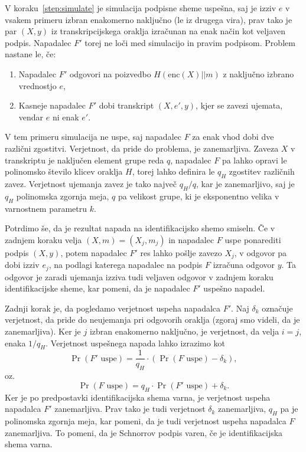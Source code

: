 \begin{dokaz}
\begin{enumerate}
    \end{enumerate}
    V koraku~\ref{step:simulate} je simulacija podpisne sheme uspešna, saj je izziv $e$ v vsakem
    primeru izbran enakomerno naključno (le iz drugega vira), prav tako je par $(X, y)$ iz
    transkripcijskega oraklja izračunan na enak način kot veljaven podpis. Napadalec $F'$ torej ne
    loči med simulacijo in pravim podpisom. Problem nastane le, če:
    \begin{enumerate}
        \item Napadalec $F'$ odgovori na poizvedbo $H(\text{enc}(X) || m)$ z naključno izbrano
            vrednostjo $e$,
        \item Kasneje napadalec $F'$ dobi transkript $(X, e', y)$, kjer se zavezi ujemata, vendar
            $e$ ni enak $e'$.
    \end{enumerate}
    V tem primeru simulacija ne uspe, saj napadalec $F$ za enak vhod dobi dve različni zgostitvi.
    Verjetnost, da pride do problema, je zanemarljiva. Zaveza $X$ v transkriptu je naključen element
    grupe reda $q$, napadalec $F$ pa lahko opravi le polinomsko število klicev oraklja $H$, torej
    lahko definira le $q_H$ zgostitev različnih zavez. Verjetnost ujemanja zavez je tako največ $q_H/q$,
    kar je zanemarljivo, saj je $q_H$ polinomska zgornja meja, $q$ pa velikost grupe, ki je eksponentno
    velika v varnostnem parametru $k$.

    Potrdimo še, da je rezultat napada na identifikacijsko shemo smiseln. Če v zadnjem koraku velja
    $(X, m) = (X_j, m_j)$ in napadalec $F$ uspe ponarediti podpis $(X, y)$, potem napadalec $F'$
    res lahko pošlje zavezo $X_j$, v odgovor pa dobi izziv $e_j$, na podlagi katerega napadalec na
    podpis $F$ izračuna odgovor $y$. Ta odgovor je zaradi ujemanja izziva tudi veljaven odgovor
    v zadnjem koraku identifikacijske sheme, kar pomeni, da je napadalec $F'$ uspešno napadel.

    Zadnji korak je, da pogledamo verjetnost uspeha napadalca $F'$. Naj $\delta_k$ označuje verjetnost,
    da pride do neujemanja pri odgovorih oraklja (zgoraj smo videli, da je zanemarljiva). Ker je $j$
    izbran enakomerno naključno, je verjetnost, da velja $i=j$, enaka $1/q_H$. Verjetnost uspešnega
    napada lahko izrazimo kot
    $$
    \Pr(F' \text{ uspe}) = \frac{1}{q_H} \cdot (\Pr(F \text{ uspe}) - \delta_k),
    $$
    oz.
    $$
    \Pr(F \text{ uspe}) = q_H \cdot \Pr(F' \text{ uspe}) + \delta_k.
    $$
    Ker je po predpostavki identifikacijska shema varna, je verjetnost uspeha napadalca $F'$
    zanemarljiva. Prav tako je tudi verjetnost $\delta_k$ zanemarljiva, $q_H$ pa je polinomska zgornja
    meja, kar pomeni, da je tudi verjetnost uspeha napadalca $F$ zanemarljiva. To pomeni, da je
    Schnorrov podpis varen, če je identifikacijska shema varna.
\end{dokaz}


